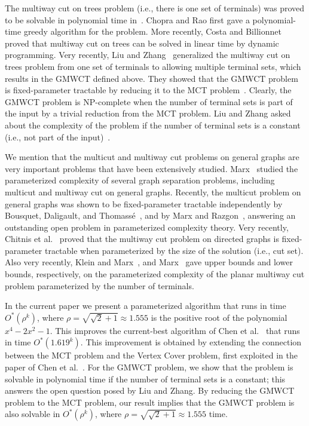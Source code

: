 \documentclass[11pt]{article}
\begin{document}
The {\sc multiway cut on trees} problem (i.e., there is one set of terminals) was proved to be
solvable in polynomial time in~\cite{CR91,CB04}. Chopra and Rao \cite{CR91}
first gave a polynomial-time greedy algorithm for the problem. More recently, Costa and Billionnet~\cite{CB04} proved that {\sc multiway cut on trees} can be solved
in linear time by dynamic programming. Very recently, Liu and Zhang~\cite{LZ12} generalized the {\sc multiway cut on trees} problem from one set of terminals to allowing multiple terminal sets, which results in the {\sc GMWCT} defined above. They showed that the {\sc GMWCT} problem is fixed-parameter tractable
by reducing it to the {\sc MCT} problem~\cite{LZ12}.  Clearly, the {\sc GMWCT} problem is NP-complete when the number of terminal sets is part of the input by a trivial reduction from the {\sc MCT} problem. Liu and Zhang asked about the complexity of the problem if the number of terminal sets is a constant (i.e., not part of the input)~\cite{LZ12}.

We mention that the {\sc multicut} and {\sc multiway cut} problems on general graphs are very important problems that have been extensively studied.
Marx~\cite{1140647} studied the parameterized complexity of several graph separation problems, including {\sc multicut} and {\sc multiway cut} on general graphs. Recently, the {\sc multicut} problem on general graphs was shown to be fixed-parameter tractable independently by Bousquet, Daligault, and Thomass\'{e}~\cite{newthomas}, and by Marx and Razgon~\cite{newmarx}, answering an outstanding open problem in parameterized complexity theory.
Very recently, Chitnis et al.~\cite{chitnis} proved that the {\sc multiway cut} problem on directed graphs is fixed-parameter tractable when parameterized by the size of the solution (i.e., cut set). Also very recently, Klein and Marx~\cite{kleinmarxplanar}, and Marx~\cite{marxplanar} gave upper bounds and lower bounds, respectively, on the parameterized complexity of the {\sc planar multiway cut} problem parameterized by the number of terminals.


In the current paper we present a parameterized algorithm that runs in time
$O^{*}(\rho^k)$, where $\rho = \sqrt{\sqrt{2} + 1} \approx 1.555$ is the positive root of the polynomial $x^4-2x^2-1$.
This improves the current-best algorithm of Chen et al.~\cite{multicut} that runs in time $O^{*}(1.619^k)$. This improvement is obtained by extending the connection between the {\sc MCT} problem and the {\sc Vertex Cover} problem, first exploited in the paper of Chen et al.~\cite{multicut}. For the {\sc GMWCT} problem, we show that the problem is solvable in polynomial time if the number of terminal sets is a constant; this answers the open question posed by Liu and Zhang. By reducing the {\sc GMWCT} problem to the {\sc MCT} problem, our result implies that the {\sc GMWCT} problem is also solvable in $O^{*}(\rho^k)$, where $\rho = \sqrt{\sqrt{2} + 1} \approx 1.555$ time.
\end{document}

